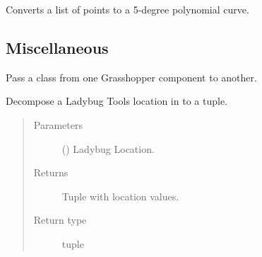 \documentclass[letterpaper,10pt,english]{sphinxmanual}
\begin{document}

\begin{fulllineitems}
\label{\detokenize{lib:livestock.lib.geometry.make_curves_from_points}}
Converts a list of points to a 5-degree polynomial curve.

\end{fulllineitems}



\subsection{Miscellaneous}
\label{\detokenize{lib:module-livestock.lib.misc}}\label{\detokenize{lib:miscellaneous}}

\begin{fulllineitems}
\label{\detokenize{lib:livestock.lib.misc.PassClass}}
Pass a class from one Grasshopper component to another.

\end{fulllineitems}


\begin{fulllineitems}
\label{\detokenize{lib:livestock.lib.misc.decompose_ladybug_location}}
Decompose a Ladybug Tools location in to a tuple.
\begin{quote}\begin{description}
\item[{Parameters}] \leavevmode
{} () \textendash{} Ladybug Location.

\item[{Returns}] \leavevmode
Tuple with location values.

\item[{Return type}] \leavevmode
tuple

\end{description}\end{quote}

\end{fulllineitems}
\end{document}
